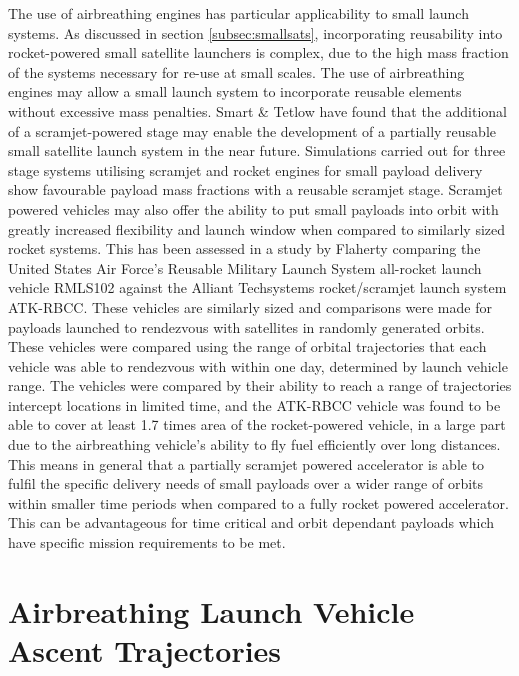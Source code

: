 The use of airbreathing engines has particular applicability to small launch systems. As discussed in section \ref{subsec:smallsats}, incorporating reusability into rocket-powered small satellite launchers is complex, due to the high mass fraction of the systems necessary for re-use at small scales. 
The use of airbreathing engines may allow a small launch system to incorporate reusable elements without excessive mass penalties. 
   Smart \& Tetlow\cite{Smart2009} have found that the additional of a scramjet-powered stage may enable the development of a partially reusable small satellite launch system in the near future. 
Simulations carried out for three stage systems utilising scramjet and rocket engines for small payload delivery show favourable payload mass fractions with a reusable scramjet stage\cite{Smart2009}. Scramjet powered vehicles may also offer the ability to put small payloads into orbit with greatly increased flexibility and launch window when compared to similarly sized rocket systems. This has been assessed in a study by Flaherty\cite{Flaherty2010} comparing the United States Air Force's Reusable Military Launch System all-rocket launch vehicle RMLS102 against the Alliant Techsystems rocket/scramjet launch system ATK-RBCC. These vehicles are similarly sized and comparisons were made for payloads launched to rendezvous with satellites in randomly generated orbits\cite{Flaherty2010}. These vehicles were compared using the range of orbital trajectories that each vehicle was able to rendezvous with within one day, determined by launch vehicle range\cite{Flaherty2010}. The vehicles were compared by their ability to reach a range of trajectories intercept locations in limited time, and the ATK-RBCC vehicle was found to be able to cover at least 1.7 times area of the rocket-powered vehicle\cite{Flaherty2010}, in a large part due to the airbreathing vehicle's ability to fly fuel efficiently over long distances. This means in general that a partially scramjet powered accelerator is able to fulfil the specific delivery needs of small payloads over a wider range of orbits within smaller time periods when compared to a fully rocket powered accelerator. This can be advantageous for time critical and orbit dependant payloads which have specific mission requirements to be met. 




 


\section{Airbreathing Launch Vehicle Ascent Trajectories}\label{sec:AscentTrajectories}


